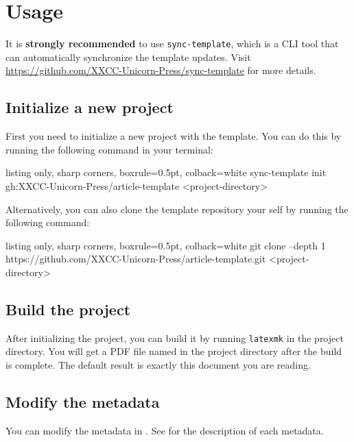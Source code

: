 \section{Usage}

It is \textbf{strongly recommended} to use \texttt{sync-template}, which is a CLI tool that can automatically synchronize the template updates.
Visit \url{https://github.com/XXCC-Unicorn-Press/sync-template} for more details.

\subsection{Initialize a new project}

First you need to initialize a new project with the template.
You can do this by running the following command in your terminal:
\begin{tcblisting}{listing only, sharp corners, boxrule=0.5pt, colback=white}
sync-template init gh:XXCC-Unicorn-Press/article-template <project-directory>
\end{tcblisting}
Alternatively, you can also clone the template repository your self by running the following command: 
\begin{tcblisting}{listing only, sharp corners, boxrule=0.5pt, colback=white}
git clone --depth 1 https://github.com/XXCC-Unicorn-Press/article-template.git <project-directory>
\end{tcblisting}

\subsection{Build the project}

After initializing the project, you can build it by running \verb|latexmk| in the project directory.
You will get a PDF file named  in the project directory after the build is complete.
The default result is exactly this document you are reading.

\subsection{Modify the metadata}

You can modify the metadata in .
See  for the description of each metadata.

